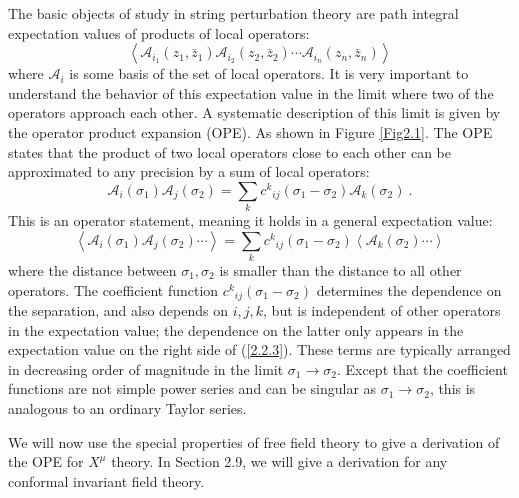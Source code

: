 The basic objects of study in string perturbation theory are path integral expectation values of products of local operators:    
\begin{equation}
	\left\langle\mathscr{A}_{i_{1}}(z_{1}, \bar{z}_{1}) \mathscr{A}_{i_{2}}(z_{2}, \bar{z}_{2}) \cdots \mathscr{A}_{i_{n}}(z_{n}, \bar{z}_{n})\right\rangle
\end{equation}
where $\mathscr{A}_{i}$ is some basis of the set of local operators. It is very important to understand the behavior of this expectation value in the limit where two of the operators approach each other. A systematic description of this limit is given by the operator product expansion (OPE).    
As shown in Figure \ref{Fig2.1}.    
The OPE states that the product of two local operators close to each other can be approximated to any precision by a sum of local operators:    
\begin{equation}
	\mathscr{A}_{i}(\sigma_{1}) \mathscr{A}_{j}(\sigma_{2})=\sum_{k} c^{k}{}_{i j}(\sigma_{1}-\sigma_{2}) \mathscr{A}_{k}(\sigma_{2}) \:.
	\label{2.2.2}
\end{equation}
This is an operator statement, meaning it holds in a general expectation value:    
\begin{equation}
	\left\langle\mathscr{A}_{i}(\sigma_{1}) \mathscr{A}_{j}(\sigma_{2}) \cdots\right\rangle
	=\sum_{k} c^{k}{}_{i j}(\sigma_{1}-\sigma_{2})\left\langle\mathscr{A}_{k}\left(\sigma_{2}\right) \cdots\right\rangle \label{2.2.3}
\end{equation}
where the distance between $\sigma_{1}, \sigma_{2}$ is smaller than the distance to all other operators. The coefficient function $c^{k}{ }_{i j}(\sigma_{1}-\sigma_{2})$ determines the dependence on the separation, and also depends on $i,j,k$, but is independent of other operators in the expectation value; the dependence on the latter only appears in the expectation value on the right side of (\ref{2.2.3}). These terms are typically arranged in decreasing order of magnitude in the limit $\sigma_{1} \rightarrow \sigma_{2}$.    
Except that the coefficient functions are not simple power series and can be singular as $\sigma_{1} \rightarrow \sigma_{2}$, this is analogous to an ordinary Taylor series.    

We will now use the special properties of free field theory to give a derivation of the OPE for $X^\mu$ theory. In Section 2.9, we will give a derivation for any conformal invariant field theory.    

